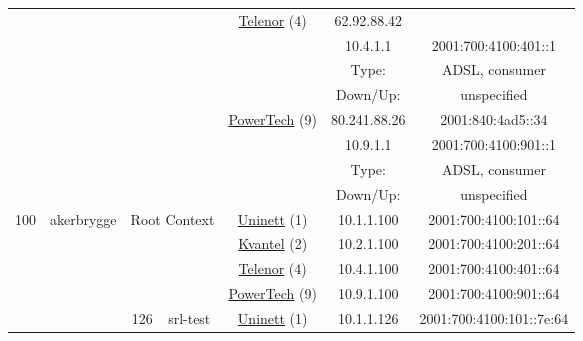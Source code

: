 \begin{small}
\begin{center}
\begin{longtable}{|c|c|c|c|c|c|c|c|}
  & \multicolumn{3}{|c|}{} & \multicolumn{2}{|c|}{\multirow{4}{*}{\tiny{\href{https://www.telenor.no}{Telenor} (4)}}} & \tiny{62.92.88.42} & \frownie{} \\* \cline{7-7}\cline{8-8}
  & \multicolumn{3}{|c|}{} & \multicolumn{2}{|c|}{} & \tiny{10.4.1.1} & \tiny{2001:700:4100:401::1} \\* \cline{7-7}\cline{8-8}
  & \multicolumn{3}{|c|}{} & \multicolumn{2}{|c|}{} & Type: & ADSL, consumer \\* \cline{7-7}\cline{8-8}
  & \multicolumn{3}{|c|}{} & \multicolumn{2}{|c|}{} & Down/Up:  & unspecified \\* \cline{5-5}\cline{6-6}\cline{7-7}\cline{8-8}
  & \multicolumn{3}{|c|}{} & \multicolumn{2}{|c|}{\multirow{4}{*}{\tiny{\href{http://www.powertech.no}{PowerTech} (9)}}} & \tiny{80.241.88.26} & \tiny{2001:840:4ad5::34} \\* \cline{7-7}\cline{8-8}
  & \multicolumn{3}{|c|}{} & \multicolumn{2}{|c|}{} & \tiny{10.9.1.1} & \tiny{2001:700:4100:901::1} \\* \cline{7-7}\cline{8-8}
  & \multicolumn{3}{|c|}{} & \multicolumn{2}{|c|}{} & Type: & ADSL, consumer \\* \cline{7-7}\cline{8-8}
  & \multicolumn{3}{|c|}{} & \multicolumn{2}{|c|}{} & Down/Up:  & unspecified \\ \hline
 \multirow{24}{*}{\tiny{100}} & \multicolumn{1}{|l|}{\multirow{24}{*}{\tiny{akerbrygge}}} & \multicolumn{2}{|c|}{\multirow{4}{*}{\tiny{Root Context}}} & \multicolumn{2}{|c|}{\tiny{\href{https://www.uninett.no}{Uninett} (1)}} & \tiny{10.1.1.100} & \tiny{2001:700:4100:101::64} \\* \cline{5-5}\cline{6-6}\cline{7-7}\cline{8-8}
  &  & \multicolumn{2}{|c|}{} & \multicolumn{2}{|c|}{\tiny{\href{http://kvantel.no}{Kvantel} (2)}} & \tiny{10.2.1.100} & \tiny{2001:700:4100:201::64} \\* \cline{5-5}\cline{6-6}\cline{7-7}\cline{8-8}
  &  & \multicolumn{2}{|c|}{} & \multicolumn{2}{|c|}{\tiny{\href{https://www.telenor.no}{Telenor} (4)}} & \tiny{10.4.1.100} & \tiny{2001:700:4100:401::64} \\* \cline{5-5}\cline{6-6}\cline{7-7}\cline{8-8}
  &  & \multicolumn{2}{|c|}{} & \multicolumn{2}{|c|}{\tiny{\href{http://www.powertech.no}{PowerTech} (9)}} & \tiny{10.9.1.100} & \tiny{2001:700:4100:901::64} \\* \cline{3-3}\cline{4-4}\cline{5-5}\cline{6-6}\cline{7-7}\cline{8-8}
  &  & \multirow{4}{*}{\tiny{126}} & \multicolumn{1}{|l|}{\multirow{4}{*}{\tiny{srl-test}}} & \multicolumn{2}{|c|}{\tiny{\href{https://www.uninett.no}{Uninett} (1)}} & \tiny{10.1.1.126} & \tiny{2001:700:4100:101::7e:64} \\* \cline{5-5}\cline{6-6}\cline{7-7}\cline{8-8}

\end{longtable}
\end{center}
\end{small}
